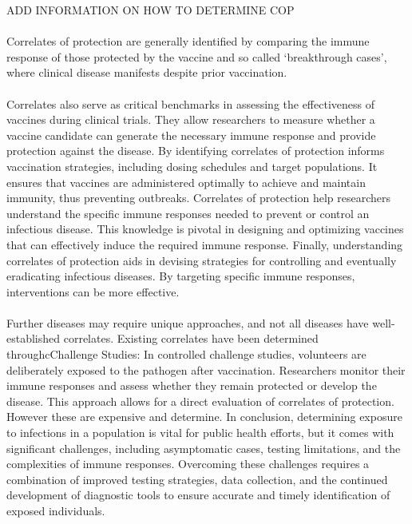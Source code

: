 \documentclass{article}
\begin{document}
ADD INFORMATION ON HOW TO DETERMINE COP 

\paragraph{}Correlates of protection are generally identified by comparing the immune response of those protected by the vaccine and so called ‘breakthrough cases’, where clinical disease manifests despite prior vaccination. 

\paragraph{} Correlates also serve as critical benchmarks in assessing the effectiveness of vaccines during clinical trials. They allow researchers to measure whether a vaccine candidate can generate the necessary immune response and provide protection against the disease. By identifying correlates of protection informs vaccination strategies, including dosing schedules and target populations. It ensures that vaccines are administered optimally to achieve and maintain immunity, thus preventing outbreaks. Correlates of protection help researchers understand the specific immune responses needed to prevent or control an infectious disease. This knowledge is pivotal in designing and optimizing vaccines that can effectively induce the required immune response. Finally, understanding correlates of protection aids in devising strategies for controlling and eventually eradicating infectious diseases. By targeting specific immune responses, interventions can be more effective.

\paragraph{}Further diseases may require unique approaches, and not all diseases have well-established correlates. Existing correlates have been determined throughcChallenge Studies: In controlled challenge studies, volunteers are deliberately exposed to the pathogen after vaccination. Researchers monitor their immune responses and assess whether they remain protected or develop the disease. This approach allows for a direct evaluation of correlates of protection. However these are expensive and determine. In conclusion, determining exposure to infections in a population is vital for public health efforts, but it comes with significant challenges, including asymptomatic cases, testing limitations, and the complexities of immune responses. Overcoming these challenges requires a combination of improved testing strategies, data collection, and the continued development of diagnostic tools to ensure accurate and timely identification of exposed individuals.
\end{document}
